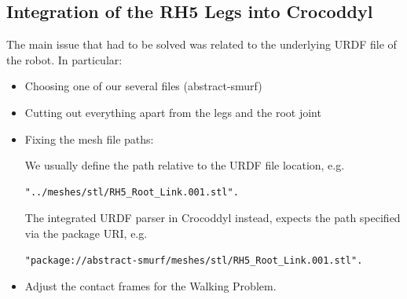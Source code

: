 \subsection{Integration of the RH5 Legs into Crocoddyl}
The main issue that had to be solved was related to the underlying URDF file of the robot. In particular: 
\begin{itemize}
\item Choosing one of our several files (abstract-smurf)
\item Cutting out everything apart from the legs and the root joint
\item Fixing the mesh file paths: 

We usually define the path relative to the URDF file location, e.g.
\begin{verbatim}
"../meshes/stl/RH5_Root_Link.001.stl".
\end{verbatim}
The integrated URDF parser in Crocoddyl instead, expects the path specified via the package URI, e.g. 
\begin{verbatim}
"package://abstract-smurf/meshes/stl/RH5_Root_Link.001.stl".
\end{verbatim}
\item Adjust the contact frames for the Walking Problem.
\end{itemize}


